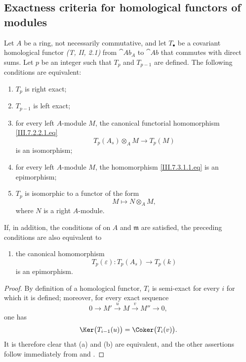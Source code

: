 \subsection{Exactness criteria for homological functors of modules}
\label{subsection:III.7.3}

\begin{proposition}[7.3.1]
\label{III.7.3.1}
Let $A$ be a ring, not necessarily commutative, and let
$T_\bullet$ be a covariant homological functor
\emph{(T, II, 2.1)} from $\cat{Ab}_A$ to $\cat{Ab}$ that
commutes with direct sums.  Let $p$ be an integer such that
$T_p$ and $T_{p-1}$ are defined.  The following conditions are
equivalent:
\begin{enumerate}
  \item[(a)] $T_p$ is right exact;
  \item[(b)] $T_{p-1}$ is left exact;


  \item[(c)] for every left $A$-module $M$, the canonical
    functorial homomorphism \eqref{III.7.2.2.1.eq}
    \[
      T_p(A_s)\otimes_A M
      \longrightarrow
      T_p(M)
      \tag{7.3.1.1}\label{III.7.3.1.1.eq}
    \]
    is an isomorphism;
  \item[(d)] for every left $A$-module $M$, the homomorphism
    \eqref{III.7.3.1.1.eq} is an epimorphism;
  \item[(e)] $T_p$ is isomorphic to a functor of the form
    \[
      M\longmapsto N\otimes_A M,
    \]
    where $N$ is a right $A$-module.
\end{enumerate}
If, in addition, the conditions of  on $A$ and
$\mathfrak m$ are satisfied, the preceding conditions are also
equivalent to
\begin{enumerate}
  \item[(f)] the canonical homomorphism
    \[
      T_p(\varepsilon):T_p(A_s)\longrightarrow T_p(k)
    \]
    is an epimorphism.
\end{enumerate}
\end{proposition}

\begin{proof}
By definition of a homological functor, $T_i$ is semi-exact for
every $i$ for which it is defined; moreover, for every exact
sequence
\[
  0\longrightarrow M'
  \xrightarrow{u}M
  \xrightarrow{v}M''
  \longrightarrow0,
\]
one has
\[
  \Ker\bigl(T_{i-1}(u)\bigr)
  =
  \Coker\bigl(T_i(v)\bigr).
\]
It is therefore clear that (a) and (b) are equivalent, and the
other assertions follow immediately from  and
.
\end{proof}

